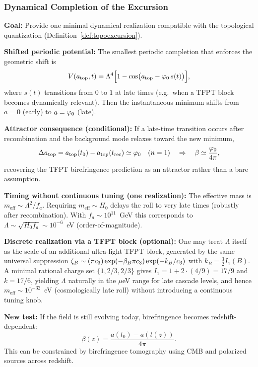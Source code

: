 \subsubsection{Dynamical Completion of the Excursion}
\label{sec:deltaa}

\begin{tcolorbox}[colback=red!3, colframe=red!50!black, 
    title={\textbf{One Minimal Dynamical Realization: Late-Time Shifted Axion Attractor}}, fonttitle=\bfseries\small]
\textbf{Goal:} Provide one minimal dynamical realization compatible with the topological quantization (Definition~\ref{def:topoexcursion}).

\textbf{Shifted periodic potential:} The smallest periodic completion that enforces the geometric shift is
\begin{equation}
    V(a_{\text{top}},t)=\Lambda^4\Bigl[1-\cos\bigl(a_{\text{top}}-\varphi_0\,s(t)\bigr)\Bigr],
    \label{eq:shifted-axion-potential}
\end{equation}
where $s(t)$ transitions from $0$ to $1$ at late times (e.g.\ when a TFPT block becomes dynamically relevant).
Then the instantaneous minimum shifts from $a=0$ (early) to $a=\varphi_0$ (late).

\textbf{Attractor consequence (conditional):} If a late-time transition occurs after recombination and the background mode relaxes toward the new minimum,
\begin{equation}
    \Delta a_{\text{top}} = a_{\text{top}}(t_0)-a_{\text{top}}(t_{\mathrm{rec}}) \simeq \varphi_0 \quad (n=1)
    \quad\Rightarrow\quad
    \beta \simeq \frac{\varphi_0}{4\pi},
\end{equation}
recovering the TFPT birefringence prediction as an attractor rather than a bare assumption.

\textbf{Timing without continuous tuning (one realization):} The effective mass is $m_{\mathrm{eff}}\sim \Lambda^2/f_a$.
Requiring $m_{\mathrm{eff}}\sim H_0$ delays the roll to very late times (robustly after recombination). With $f_a\sim 10^{11}$~GeV this corresponds to
$\Lambda\sim \sqrt{H_0 f_a}\sim 10^{-6}$~eV (order-of-magnitude).

\textbf{Discrete realization via a TFPT block (optional):} One may treat $\Lambda$ itself as the scale of an additional ultra-light TFPT block,
generated by the same universal suppression $\zeta_B \sim (\pi c_3)\exp(-\beta_B\pi c_3)\exp(-k_B/c_3)$ with $k_B=\frac{3}{2}I_1(B)$.
A minimal rational charge set $\{1,2/3,2/3\}$ gives $I_1=1+2\cdot(4/9)=17/9$ and $k=17/6$, yielding $\Lambda$ naturally in the $\mu$eV range for late cascade levels,
and hence $m_{\mathrm{eff}}\sim 10^{-32}$~eV (cosmologically late roll) without introducing a continuous tuning knob.

\textbf{New test:} If the field is still evolving today, birefringence becomes redshift-dependent:
\begin{equation}
    \beta(z)=\frac{a(t_0)-a(t(z))}{4\pi}.
\end{equation}
This can be constrained by birefringence tomography using CMB and polarized sources across redshift.
\end{tcolorbox}

